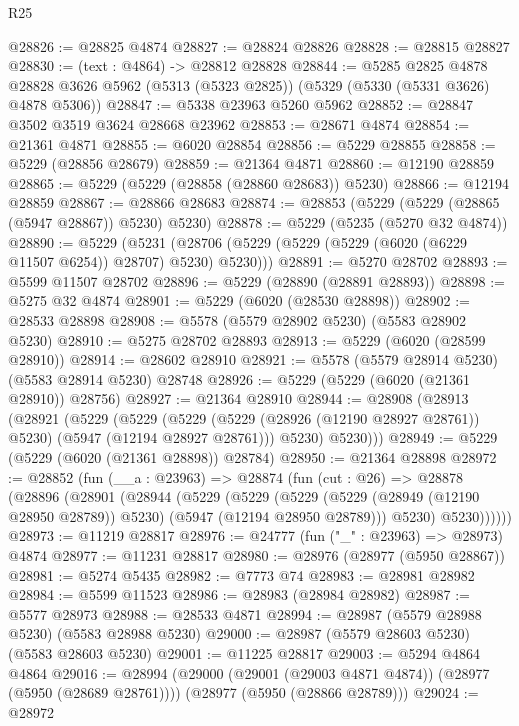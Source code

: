 \begin{lexlean}{R25}
\begin{coremodule}
@28826 := @28825 @4874
@28827 := @28824 @28826
@28828 := @28815 @28827
@28830 := (text : @4864) -> @28812 @28828
@28844 := @5285
    @2825
    @4878
    @28828
    @3626
    @5962
    (@5313 (@5323 @2825))
    (@5329 (@5330 (@5331 @3626) @4878 @5306))
@28847 := @5338 @23963 @5260 @5962
@28852 := @28847 @3502 @3519 @3624 @28668 @23962
@28853 := @28671 @4874
@28854 := @21361 @4871
@28855 := @6020 @28854
@28856 := @5229 @28855
@28858 := @5229 (@28856 @28679)
@28859 := @21364 @4871
@28860 := @12190 @28859
@28865 := @5229 (@5229 (@28858 (@28860 @28683)) @5230)
@28866 := @12194 @28859
@28867 := @28866 @28683
@28874 := @28853 (@5229 (@5229 (@28865 (@5947 @28867)) @5230) @5230)
@28878 := @5229 (@5235 (@5270 @32 @4874))
@28890 := @5229
    (@5231 (@28706 (@5229 (@5229 (@5229 (@6020 (@6229 @11507 @6254)) @28707) @5230) @5230)))
@28891 := @5270 @28702
@28893 := @5599 @11507 @28702
@28896 := @5229 (@28890 (@28891 @28893))
@28898 := @5275 @32 @4874
@28901 := @5229 (@6020 (@28530 @28898))
@28902 := @28533 @28898
@28908 := @5578 (@5579 @28902 @5230) (@5583 @28902 @5230)
@28910 := @5275 @28702 @28893
@28913 := @5229 (@6020 (@28599 @28910))
@28914 := @28602 @28910
@28921 := @5578 (@5579 @28914 @5230) (@5583 @28914 @5230) @28748
@28926 := @5229 (@5229 (@6020 (@21361 @28910)) @28756)
@28927 := @21364 @28910
@28944 := @28908
    (@28913
      (@28921
        (@5229
          (@5229
            (@5229 (@5229 (@28926 (@12190 @28927 @28761)) @5230) (@5947 (@12194 @28927 @28761)))
            @5230)
          @5230)))
@28949 := @5229 (@5229 (@6020 (@21361 @28898)) @28784)
@28950 := @21364 @28898
@28972 := @28852
    (fun (__a : @23963) =>
    @28874
      (fun (cut : @26) =>
      @28878
        (@28896
          (@28901
            (@28944
              (@5229
                (@5229
                  (@5229
                    (@5229 (@28949 (@12190 @28950 @28789)) @5230)
                    (@5947 (@12194 @28950 @28789)))
                  @5230)
                @5230))))))
@28973 := @11219 @28817
@28976 := @24777 (fun ("_" : @23963) => @28973) @4874
@28977 := @11231 @28817
@28980 := @28976 (@28977 (@5950 @28867))
@28981 := @5274 @5435
@28982 := @7773 @74
@28983 := @28981 @28982
@28984 := @5599 @11523
@28986 := @28983 (@28984 @28982)
@28987 := @5577 @28973
@28988 := @28533 @4871
@28994 := @28987 (@5579 @28988 @5230) (@5583 @28988 @5230)
@29000 := @28987 (@5579 @28603 @5230) (@5583 @28603 @5230)
@29001 := @11225 @28817
@29003 := @5294 @4864 @4864
@29016 := @28994
    (@29000 (@29001 (@29003 @4871 @4874)) (@28977 (@5950 (@28689 @28761))))
    (@28977 (@5950 (@28866 @28789)))
@29024 := @28972

\end{coremodule}
\end{lexlean}
